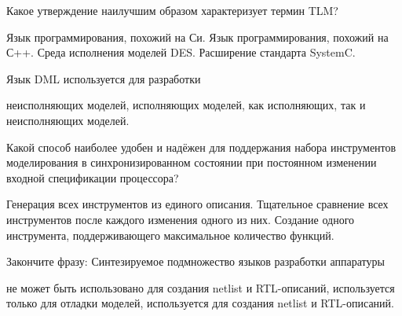 \begin{questions}

\question[3] Какое утверждение наилучшим образом характеризует термин TLM?
\begin{choices}
    \choice Язык программирования, похожий на Си.
    \choice Язык программирования, похожий на С++.
    \choice Среда исполнения моделей DES.
    \correctchoice Расширение стандарта SystemC.
\end{choices}

\question[3] Язык DML используется для разработки
\begin{choices}
    \correctchoice неисполняющих моделей,
    \choice исполняющих моделей,
    \choice как исполняющих, так и неисполняющих моделей.
\end{choices}

\question[3] Какой способ наиболее удобен и надёжен для поддержания набора инструментов моделирования в синхронизированном состоянии при постоянном изменении входной спецификации процессора?
\begin{choices}
    \correctchoice Генерация всех инструментов из единого описания.
    \choice Тщательное сравнение всех инструментов после каждого изменения одного из них.
    \choice Создание одного инструмента, поддерживающего максимальное количество функций.
\end{choices}

\question[3] Закончите фразу: Синтезируемое подмножество языков разработки аппаратуры
\begin{choices}
\choice не может быть использовано для создания netlist и RTL-описаний,
\choice используется только для отладки моделей,
\correctchoice  используется для создания netlist и RTL-описаний.
\end{choices}

\end{questions}

